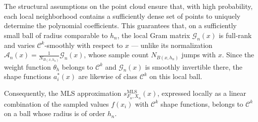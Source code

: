 \documentclass{article}
\newcommand{\mlsfunstoch}{s^\text{MLS}_{F_n,X_n}}
\begin{document}
The structural assumptions on the point cloud ensure that, with high probability, each local neighborhood contains a sufficiently dense set of points to uniquely determine the polynomial coefficients. This guarantees that, on a sufficiently small ball of radius comparable to $h_n$, the local Gram matrix $\mathscr{G}_n(x)$ is full-rank and varies $\mathcal{C}^k$-smoothly with respect to $x$ --- unlike its normalization $\mathscr{A}_n(x)=\frac{1}{N_{B(x,h_n)}}\mathscr{G}_n(x)$, whose sample count $N_{B(x,h_n)}$ jumps with $x$. Since the weight function $\theta_h$ belongs to $\mathcal{C}^k$ and $\mathscr{G}_n(x)$ is smoothly invertible there, the shape functions $a_i^*(x)$ are likewise of class $\mathcal{C}^k$ on this local ball.

Consequently, the MLS approximation $\mlsfunstoch(x)$, expressed locally as a linear combination of the sampled values $f(x_i)$ with $\mathcal{C}^k$ shape functions, belongs to $\mathcal{C}^k$ on a ball whose radius is of order $h_n$. 
\end{document}
